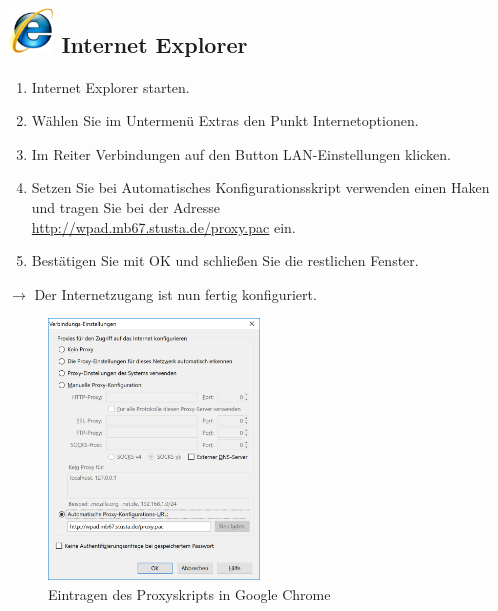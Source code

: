 \documentclass[a4paper,12pt]{scrartcl}
\begin{document}
\subsection*{\includegraphics[height=1.2cm,keepaspectratio]{Bilder/Internet_Explorer_7_Logo} Internet Explorer}
\begin{enumerate}
    \item Internet Explorer starten.
    \item Wählen Sie im Untermenü Extras den Punkt Internetoptionen.
    \item Im Reiter Verbindungen auf den Button LAN-Ein\-stellungen klicken.
    \item Setzen Sie bei Automatisches Konfigurationsskript verwenden einen Haken und tragen Sie bei der Adresse \\ \url{http://wpad.mb67.stusta.de/proxy.pac} ein.
    \item Bestätigen Sie mit OK und schließen Sie die restlichen Fenster.
\end{enumerate}
$\rightarrow$ Der Internetzugang ist nun fertig konfiguriert.


\newpage
\begin{figure}
  \vspace{-40pt}
  \begin{center}
    \includegraphics[width=0.5\textwidth,keepaspectratio]{Bilder/Proxy_Firefox}
  \end{center}
  \caption{Eintragen des Proxyskripts in Google Chrome}
\end{figure}
\end{document}
